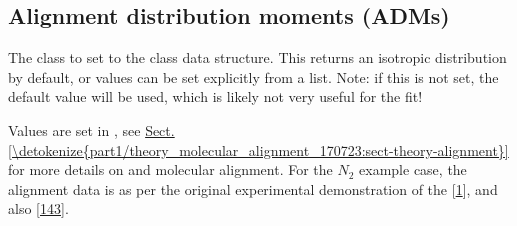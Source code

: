 \documentclass[letterpaper,table,10pt,english]{jupyterBook}
\begin{document}
\subsection{Alignment distribution moments (ADMs)}
\label{\detokenize{part2/basic_fitting_numerics_intro_260723:alignment-distribution-moments-adms}}
\sphinxAtStartPar
The class  to set {\hyperref[\detokenize{backmatter/glossary:term-ADMs}]{}} to the class data structure. This returns an isotropic distribution by default, or values can be set explicitly from a list. Note: if this is not set, the default value will be used, which is likely not very useful for the fit!

\sphinxAtStartPar
Values are set in , see \hyperref[\detokenize{part1/theory_molecular_alignment_170723:sect-theory-alignment}]{Sect.\@ \ref{\detokenize{part1/theory_molecular_alignment_170723:sect-theory-alignment}}} for more details on {\hyperref[\detokenize{backmatter/glossary:term-ADMs}]{}} and molecular alignment. For the \(N_2\) example case, the alignment data is as per the original experimental demonstration of the {\hyperref[\detokenize{backmatter/glossary:term-bootstrap-retrieval-protocol}]{}} {[}\hyperlink{cite.backmatter/bibliography:id776}{1}{]}, and also  {[}\hyperlink{cite.backmatter/bibliography:id673}{143}{]}.
\end{document}
